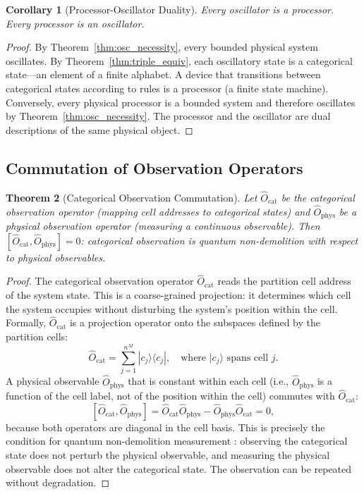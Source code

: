 \documentclass[11pt,twocolumn,a4paper]{article}
\newtheorem{theorem}{Theorem}[section]
\newtheorem{corollary}[theorem]{Corollary}
\theoremstyle{definition}
\theoremstyle{remark}
\newcommand{\Ocat}{\hat{O}_{\mathrm{cat}}}
\newcommand{\Ophys}{\hat{O}_{\mathrm{phys}}}
\begin{document}
\begin{corollary}[Processor-Oscillator Duality]
\label{cor:proc_osc_duality}
Every oscillator is a processor. Every processor is an oscillator.
\end{corollary}

\begin{proof}
By Theorem~\ref{thm:osc_necessity}, every bounded physical system oscillates. By Theorem~\ref{thm:triple_equiv}, each oscillatory state is a categorical state---an element of a finite alphabet. A device that transitions between categorical states according to rules is a processor (a finite state machine). Conversely, every physical processor is a bounded system and therefore oscillates by Theorem~\ref{thm:osc_necessity}. The processor and the oscillator are dual descriptions of the same physical object.
\end{proof}

\subsection{Commutation of Observation Operators}

\begin{theorem}[Categorical Observation Commutation]
\label{thm:commutation}
Let $\Ocat$ be the categorical observation operator (mapping cell addresses to categorical states) and $\Ophys$ be a physical observation operator (measuring a continuous observable). Then $[\Ocat, \Ophys] = 0$: categorical observation is quantum non-demolition with respect to physical observables.
\end{theorem}

\begin{proof}
The categorical observation operator $\Ocat$ reads the partition cell address of the system state. This is a coarse-grained projection: it determines which cell the system occupies without disturbing the system's position within the cell. Formally, $\Ocat$ is a projection operator onto the subspaces defined by the partition cells:
\[
\Ocat = \sum_{j=1}^{n^M} |c_j\rangle \langle c_j|, \quad \text{where } |c_j\rangle \text{ spans cell } j.
\]
A physical observable $\Ophys$ that is constant within each cell (i.e., $\Ophys$ is a function of the cell label, not of the position within the cell) commutes with $\Ocat$:
\[
[\Ocat, \Ophys] = \Ocat \Ophys - \Ophys \Ocat = 0,
\]
because both operators are diagonal in the cell basis. This is precisely the condition for quantum non-demolition measurement \citep{braginsky1992}: observing the categorical state does not perturb the physical observable, and measuring the physical observable does not alter the categorical state. The observation can be repeated without degradation.
\end{proof}
\end{document}
